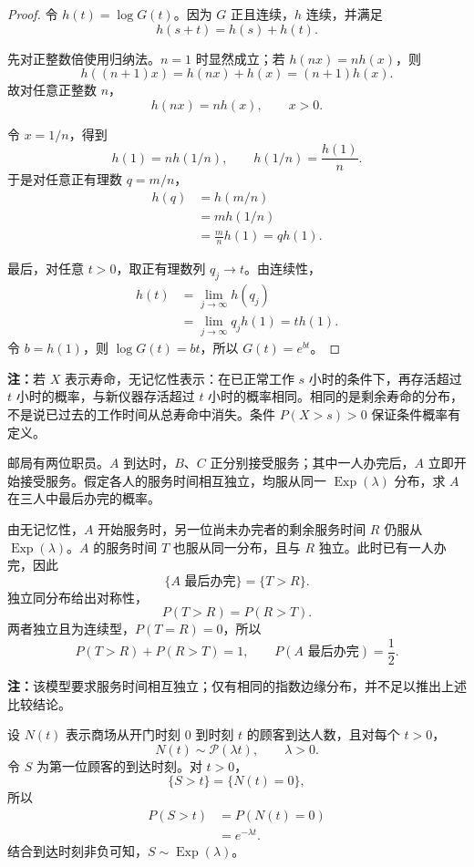 \begin{proof}
令 $h(t)=\log G(t)$。因为 $G$ 正且连续，$h$ 连续，并满足
\[
h(s+t)=h(s)+h(t).
\]

先对正整数倍使用归纳法。$n=1$ 时显然成立；若 $h(nx)=nh(x)$，则
\[
h((n+1)x)=h(nx)+h(x)=(n+1)h(x).
\]
故对任意正整数 $n$，
\[
h(nx)=nh(x),\qquad x>0.
\]

令 $x=1/n$，得到
\[
h(1)=nh(1/n),
\qquad h(1/n)=\frac{h(1)}n.
\]
于是对任意正有理数 $q=m/n$，
\[
\begin{aligned}
h(q)&=h(m/n)\\
&=mh(1/n)\\
&=\frac mn h(1)=qh(1).
\end{aligned}
\]

最后，对任意 $t>0$，取正有理数列 $q_j\to t$。由连续性，
\[
\begin{aligned}
h(t)&=\lim_{j\to\infty}h(q_j)\\
&=\lim_{j\to\infty}q_jh(1)=th(1).
\end{aligned}
\]
令 $b=h(1)$，则 $\log G(t)=bt$，所以 $G(t)=e^{bt}$。
\end{proof}

\textbf{注：}\quad 若 $X$ 表示寿命，无记忆性表示：在已正常工作 $s$ 小时的条件下，再存活超过 $t$ 小时的概率，与新仪器存活超过 $t$ 小时的概率相同。相同的是剩余寿命的分布，不是说已过去的工作时间从总寿命中消失。条件 $P(X>s)>0$ 保证条件概率有定义。

\begin{example}[邮局中最后办完事情的人]
邮局有两位职员。$A$ 到达时，$B$、$C$ 正分别接受服务；其中一人办完后，$A$ 立即开始接受服务。假定各人的服务时间相互独立，均服从同一 $\operatorname{Exp}(\lambda)$ 分布，求 $A$ 在三人中最后办完的概率。

由无记忆性，$A$ 开始服务时，另一位尚未办完者的剩余服务时间 $R$ 仍服从 $\operatorname{Exp}(\lambda)$。$A$ 的服务时间 $T$ 也服从同一分布，且与 $R$ 独立。此时已有一人办完，因此
\[
\{A\text{ 最后办完}\}=\{T>R\}.
\]
独立同分布给出对称性，
\[
P(T>R)=P(R>T).
\]
两者独立且为连续型，$P(T=R)=0$，所以
\[
P(T>R)+P(R>T)=1,
\qquad
P(A\text{ 最后办完})=\frac12.
\]

\textbf{注：}\quad 该模型要求服务时间相互独立；仅有相同的指数边缘分布，并不足以推出上述比较结论。
\end{example}

\begin{example}[第一位顾客的到达时刻]
设 $N(t)$ 表示商场从开门时刻 $0$ 到时刻 $t$ 的顾客到达人数，且对每个 $t>0$，
\[
N(t)\sim\mathcal P(\lambda t),\qquad \lambda>0.
\]
令 $S$ 为第一位顾客的到达时刻。对 $t>0$，
\[
\{S>t\}=\{N(t)=0\},
\]
所以
\[
\begin{aligned}
P(S>t)
&=P(N(t)=0)\\
&=e^{-\lambda t}.
\end{aligned}
\]
结合到达时刻非负可知，$S\sim\operatorname{Exp}(\lambda)$。
\end{example}

